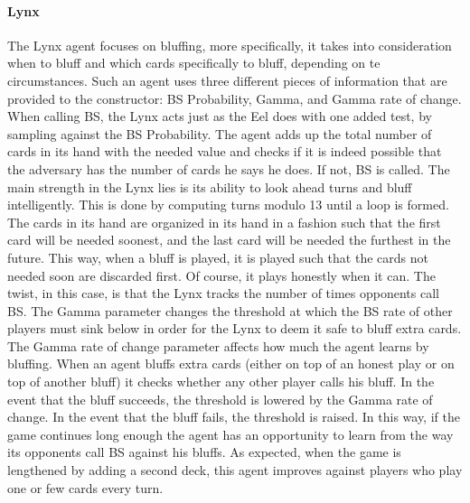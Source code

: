 \documentclass[a4paper,11pt]{article}
\begin{document}
	\paragraph{Lynx}
	The Lynx agent focuses on bluffing, more specifically, it takes into consideration when to bluff and which cards specifically to bluff, depending on te circumstances. Such an agent uses three different pieces of information that are provided to the constructor: BS Probability, Gamma, and Gamma rate of change. When calling BS, the Lynx acts just as the Eel does with one added test, by sampling against the BS Probability. The agent adds up the total number of cards in its hand with the needed value and checks if it is indeed possible that the adversary has the number of cards he says he does. If not, BS is called. The main strength in the Lynx lies is its ability to look ahead turns and bluff intelligently. This is done by computing turns modulo 13 until a loop is formed. The cards in its hand are organized in its hand in a fashion such that the first card will be needed soonest, and the last card will be needed the furthest in the future. This way, when a bluff is played, it is played such that the cards not needed soon are discarded first. Of course, it plays honestly when it can. The twist, in this case, is that the Lynx tracks the number of times opponents call BS. The Gamma parameter changes the threshold at which the BS rate of other players must sink below in order for the Lynx to deem it safe to bluff extra cards. The Gamma rate of change parameter affects how much the agent learns by bluffing. When an agent bluffs extra cards (either on top of an honest play or on top of another bluff) it checks whether any other player calls his bluff. In the event that the bluff succeeds, the threshold is lowered by the Gamma rate of change. In the event that the bluff fails, the threshold is raised. In this way, if the game continues long enough the agent has an opportunity to learn from the way its opponents call BS against his bluffs. As expected, when the game is lengthened by adding a second deck, this agent improves against players who play one or few cards every turn. 
\end{document}
